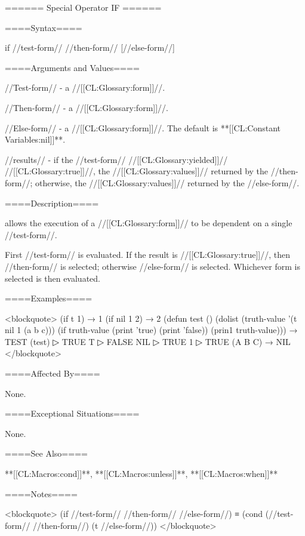 ====== Special Operator IF ======

====Syntax====

\DefspecWithValues if {//test-form// //then-form// [//else-form//]} {}

====Arguments and Values====

//Test-form// - a //[[CL:Glossary:form]]//.

//Then-form// - a //[[CL:Glossary:form]]//.

//Else-form// - a //[[CL:Glossary:form]]//. The default is **[[CL:Constant Variables:nil]]**.

//results// - if the //test-form// //[[CL:Glossary:yielded]]// //[[CL:Glossary:true]]//, the //[[CL:Glossary:values]]// returned by the //then-form//; otherwise, the //[[CL:Glossary:values]]// returned by the //else-form//.

====Description====

 allows the execution of a //[[CL:Glossary:form]]// to be dependent on a single //test-form//.

First //test-form// is evaluated. If the result is //[[CL:Glossary:true]]//, then //then-form// is selected; otherwise //else-form// is selected. Whichever form is selected is then evaluated.

====Examples====

<blockquote> (if t 1) → 1 (if nil 1 2) → 2 (defun test () (dolist (truth-value '(t nil 1 (a b c))) (if truth-value (print 'true) (print 'false)) (prin1 truth-value))) → TEST (test)
▷ TRUE T
▷ FALSE NIL
▷ TRUE 1
▷ TRUE (A B C) → NIL </blockquote>

====Affected By====

None.

====Exceptional Situations====

None.

====See Also====

**[[CL:Macros:cond]]**, **[[CL:Macros:unless]]**, **[[CL:Macros:when]]**

====Notes====

<blockquote> (if //test-form// //then-form// //else-form//) ≡ (cond (//test-form// //then-form//) (t //else-form//)) </blockquote>

